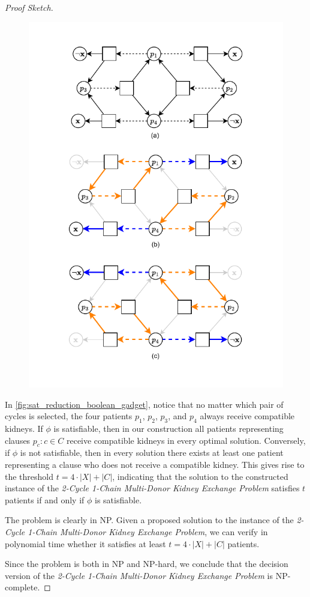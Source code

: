 \begin{proof}[Proof Sketch]
\begin{figure}
    \centering
    \includegraphics{data/sat_reduction_boolean_gadget.pdf}
    \caption[]{}
    \label{fig:sat_reduction_boolean_gadget}
\end{figure}

In \autoref{fig:sat_reduction_boolean_gadget}, notice that no matter which pair of cycles is selected, the four patients $p_1$, $p_2$, $p_3$, and $p_4$ always receive compatible kidneys. If $\phi$ is satisfiable, then in our construction all patients representing clauses ${ p_c : c \in C }$ receive compatible kidneys in every optimal solution. Conversely, if $\phi$ is not satisfiable, then in every solution there exists at least one patient representing a clause who does not receive a compatible kidney. This gives rise to the threshold $t = 4 \cdot |X| + |C|$, indicating that the solution to the constructed instance of the \textit{2-Cycle 1-Chain Multi-Donor Kidney Exchange Problem} satisfies $t$ patients if and only if $\phi$ is satisfiable.

The problem is clearly in NP. Given a proposed solution to the instance of the \textit{2-Cycle 1-Chain Multi-Donor Kidney Exchange Problem}, we can verify in polynomial time whether it satisfies at least $t = 4 \cdot |X| + |C|$ patients. 

Since the problem is both in NP and NP-hard, we conclude that the decision version of the \textit{2-Cycle 1-Chain Multi-Donor Kidney Exchange Problem} is NP-complete.
\end{proof}


